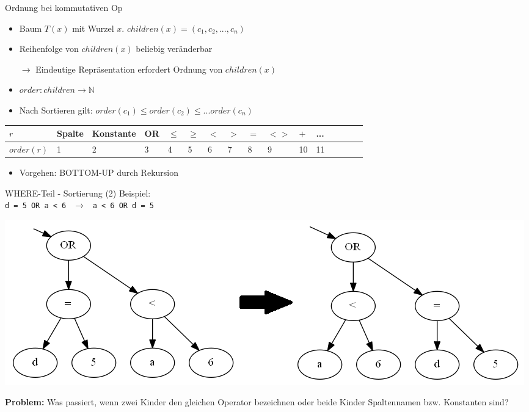 \documentclass{beamer}
\begin{document}
\begin{frame}[fragile]{Ordnung bei kommutativen Op}
\begin{itemize}
\item Baum $T(x)$ mit Wurzel $x$. $children(x) = (c_1,c_2,...,c_n)$
\item Reihenfolge von $children(x)$ beliebig veränderbar
\item[$\to$] Eindeutige Repräsentation erfordert Ordnung von $children(x)$\pause
\item $order: children \to \mathbb{N}$
\item Nach Sortieren gilt: $order(c_1) \leq order(c_2) \leq ... order(c_n)$
\end{itemize}
\begin{tabular}{|l|l|l|l|l|l|l|l|l|l|l|l|l|l|l|l|}
\hline
$r$ & Spalte & Konstante & OR & $\le$ & $\ge$ & $<$ & $>$ & $=$ & $<>$ & $+$ & ...\\\hline
$\textit{order}(r)$ & 1 & 2 & 3 & 4 & 5 & 6 & 7 & 8 & 9 & 10 & 11\\ 
\hline
\end{tabular}\newline
\vspace{3mm}
\begin{itemize}
\item Vorgehen: BOTTOM-UP durch Rekursion
\end{itemize}
\end{frame}

\begin{frame}[fragile]{WHERE-Teil - Sortierung (2)}
Beispiel:\\
\verb|d = 5 OR a < 6| $\ \ \to\ \ $ \verb|a < 6 OR d = 5|\\
\begin{center}
\includegraphics[scale=0.3]{sort_step1.png}
\end{center}\pause
\textbf{Problem: }Was passiert, wenn zwei Kinder den gleichen Operator bezeichnen oder beide Kinder Spaltennamen bzw. Konstanten sind?
\end{frame}
\end{document}
